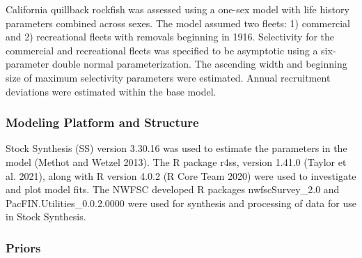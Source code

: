 \documentclass[11pt,
  english,
  a4paper,
]{article}
\begin{document}
\leavevmode\tagmcend\tagstructend


California quillback rockfish was assessed using a one-sex model with life history parameters combined across sexes. The model assumed two fleets: 1) commercial and 2) recreational fleets with removals beginning in 1916. Selectivity for the commercial and recreational fleets was specified to be asymptotic using a six-parameter double normal parameterization. The ascending width and beginning size of maximum selectivity parameters were estimated. Annual recruitment deviations were estimated within the base model.

\leavevmode\tagmcend\tagstructend\par


\hypertarget{modeling-platform-and-structure}{%
\subsubsection{Modeling Platform and Structure}\label{modeling-platform-and-structure}}

\leavevmode\tagmcend\tagstructend


Stock Synthesis (SS) version 3.30.16 was used to estimate the parameters in the model {(Methot and Wetzel 2013)\leavevmode\tagmcend\tagstructend}. The R package r4ss, version 1.41.0 {(Taylor et al. 2021)\leavevmode\tagmcend\tagstructend}, along with R version 4.0.2 {(R Core Team 2020)\leavevmode\tagmcend\tagstructend} were used to investigate and plot model fits. The NWFSC developed R packages nwfscSurvey\_2.0 and PacFIN.Utilities\_0.0.2.0000 were used for synthesis and processing of data for use in Stock Synthesis.

\leavevmode\tagmcend\tagstructend\par


\hypertarget{priors}{%
\subsubsection{Priors}\label{priors}}
\end{document}
